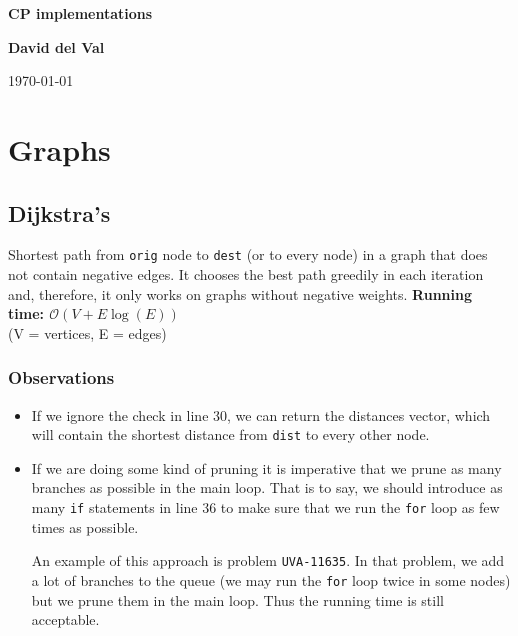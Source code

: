 \documentclass[12pt]{report}
\begin{document}
\begin{titlepage}
    \begin{center}
        \vspace*{1cm}
 
        \Huge
        \textbf{CP implementations}
 

 
        \vspace{1.5cm}
 
        \textbf{David del Val}
 
        \vfill
 
 
        \vspace{0.8cm}
 
 
        \Large
	\today
 
    \end{center}
\end{titlepage}

\setcounter{tocdepth}{2}
\tableofcontents 

\chapter{Graphs}

\section{Dijkstra's}
Shortest path from \texttt{orig} node to \texttt{dest} (or to every node) in a graph
that does not contain negative edges. 
It chooses the best path greedily in each iteration and, therefore, it only works
on graphs without negative weights. 
\noindent \textbf{\boldmath Running time: $\mathcal{O}(V+E\log(E))$}
\\ {\small(V = vertices, E = edges)}

\subsection*{Observations}
\begin{itemize}
	\item If we ignore the check in line 30, we can return the distances 
		vector, which will contain the shortest distance from \texttt{dist}
		to every other node.
	\item If we are doing some kind of pruning it is imperative that we prune 
	as many branches as possible in the main loop. That is to say, we should
	introduce as many \texttt{if} statements in line 36 to make sure that we
	run the \texttt{for} loop as few times as possible. 

	An example of this approach is problem \texttt{UVA-11635}. In that problem, we
	add a lot of branches to the queue (we may run the \texttt{for} loop
	twice in some nodes) but we prune them in the main loop. Thus the 
	running time is still acceptable.

\end{itemize}
\end{document}
